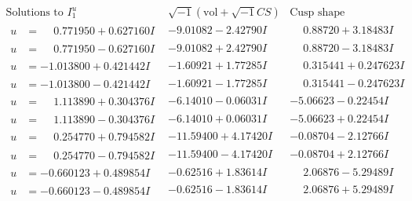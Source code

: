 \documentclass[1p]{elsarticle_modified}
\theoremstyle{definition}
\newcommand{\I}{\sqrt{-1}}
\begin{document}
$$\begin{array}{c|c|c}  
\text{Solutions to }I^u_{1}& \I (\text{vol} + \sqrt{-1}CS) & \text{Cusp shape}\\
 \hline 
\begin{aligned}
u &= \phantom{-}0.771950 + 0.627160 I\end{aligned}
 & -9.01082 - 2.42790 I & \phantom{-}0.88720 + 3.18483 I \\ \hline\begin{aligned}
u &= \phantom{-}0.771950 - 0.627160 I\end{aligned}
 & -9.01082 + 2.42790 I & \phantom{-}0.88720 - 3.18483 I \\ \hline\begin{aligned}
u &= -1.013800 + 0.421442 I\end{aligned}
 & -1.60921 + 1.77285 I & \phantom{-}0.315441 + 0.247623 I \\ \hline\begin{aligned}
u &= -1.013800 - 0.421442 I\end{aligned}
 & -1.60921 - 1.77285 I & \phantom{-}0.315441 - 0.247623 I \\ \hline\begin{aligned}
u &= \phantom{-}1.113890 + 0.304376 I\end{aligned}
 & -6.14010 - 0.06031 I & -5.06623 - 0.22454 I \\ \hline\begin{aligned}
u &= \phantom{-}1.113890 - 0.304376 I\end{aligned}
 & -6.14010 + 0.06031 I & -5.06623 + 0.22454 I \\ \hline\begin{aligned}
u &= \phantom{-}0.254770 + 0.794582 I\end{aligned}
 & -11.59400 + 4.17420 I & -0.08704 - 2.12766 I \\ \hline\begin{aligned}
u &= \phantom{-}0.254770 - 0.794582 I\end{aligned}
 & -11.59400 - 4.17420 I & -0.08704 + 2.12766 I \\ \hline\begin{aligned}
u &= -0.660123 + 0.489854 I\end{aligned}
 & -0.62516 + 1.83614 I & \phantom{-}2.06876 - 5.29489 I \\ \hline\begin{aligned}
u &= -0.660123 - 0.489854 I\end{aligned}
 & -0.62516 - 1.83614 I & \phantom{-}2.06876 + 5.29489 I \\ \hline\begin{aligned}

\end{aligned}
\end{array}$$
\end{document}
